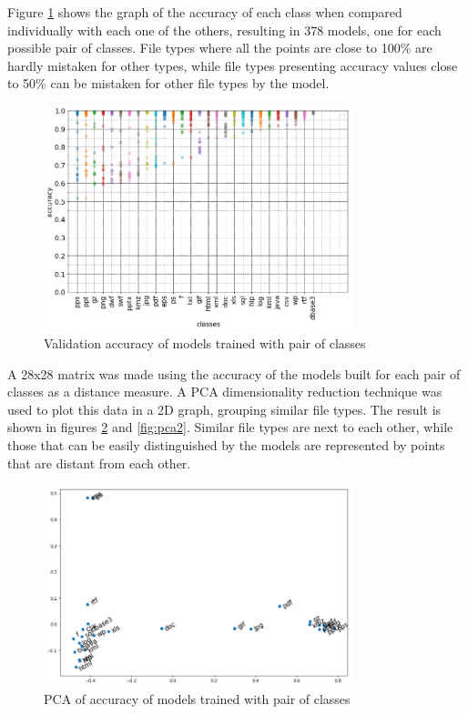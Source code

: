 
Figure \ref{fig:dual} shows the graph of the accuracy of each class when compared individually with each one of the others, resulting in 378 models, one for each possible pair of classes. File types where all the points are close to 100\% are hardly mistaken for other types, while file types presenting accuracy values close to 50\% can be mistaken for other file types by the model.

\noindent
\begin{figure}[htb!]
\centering\includegraphics[width=0.8\textwidth]{content/dual.png}
\caption{\label{fig:dual}Validation accuracy of models trained with pair of classes}%
\end{figure}


A 28x28 matrix was made using the accuracy of the models built for each pair of classes as a distance measure. A PCA dimensionality reduction technique was used to plot this data in a 2D graph, grouping similar file types. The result is shown in figures \ref{fig:pca} and \ref{fig:pca2}. Similar file types are next to each other, while those that can be easily distinguished by the models are represented by points that are distant from each other.

\noindent
\begin{figure}[htb!]
\centering\includegraphics[width=0.8\textwidth]{content/pca.png}
\caption{\label{fig:pca}PCA of accuracy of models trained with pair of classes}%
\end{figure}


